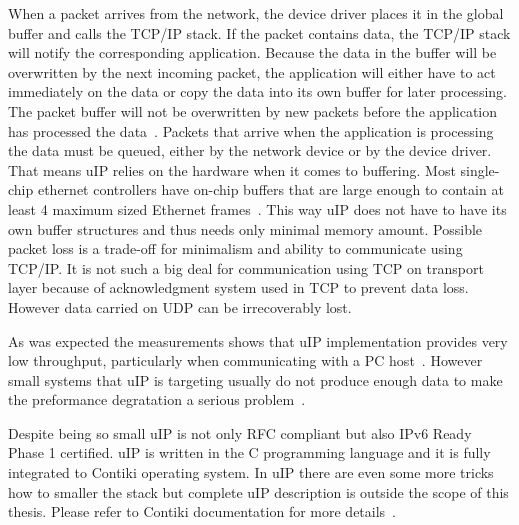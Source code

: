 When a packet arrives from the network, the device driver places it in the
global buffer and calls the TCP/IP stack.
If the packet contains data, the TCP/IP stack will notify the corresponding application.
Because the data in the buffer will be overwritten by the next incoming packet,
the application will either have to act immediately on the data or copy the data into
its own buffer for later processing.
The packet buffer will not be overwritten by new packets before the application has processed the data~\cite{contiki-docs}.
Packets that arrive when the application is processing the data must be queued,
either by the network device or by the device driver.
That means uIP relies on the hardware when it comes to buffering.
Most single-chip ethernet controllers have on-chip buffers
that are large enough to contain at least 4 maximum sized Ethernet frames~\cite{contiki-docs}.
This way uIP does not have to have its own buffer structures and thus
needs only minimal memory amount.
Possible packet loss is a trade-off for minimalism and ability to communicate using TCP/IP.
It is not such a big deal for communication using TCP on transport layer
because of acknowledgment system used in TCP to prevent data loss.
However data carried on UDP can be irrecoverably lost.

As was expected the measurements shows that uIP implementation provides very low
throughput, particularly when communicating with a PC host~\cite{thesis-towards}.
However small systems that uIP is targeting usually do not produce enough data
to make the preformance degratation a serious problem~\cite{thesis-towards}.

Despite being so small uIP is not only RFC compliant but also IPv6 Ready Phase 1 certified.
uIP is written in the C programming language and it is fully integrated to Contiki operating system.
In uIP there are even some more tricks how to smaller the stack
but complete uIP description is outside the scope of this thesis.
Please refer to Contiki documentation for more details~\cite{contiki-docs}.
